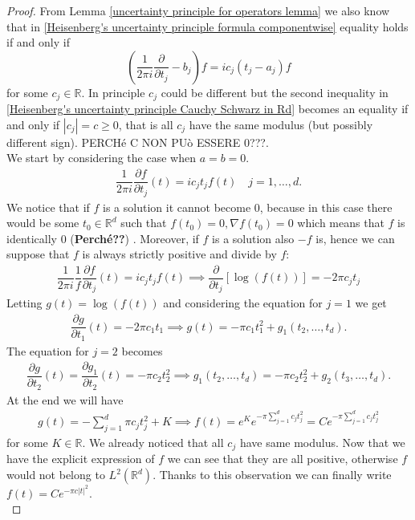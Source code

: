 \documentclass[corpo=11pt, stile=classica, tipotesi=custom,
greek, evenboxes, english]{toptesi}
\numberwithin{equation}{chapter}
\newcommand{\R}{\mathbb{R}} %
\newcommand{\pdfrac}[2]{\dfrac{\partial #1}{\partial #2}}
\begin{document}
\begin{proof}
	{\color{red} From Lemma \ref{uncertainty principle for operators lemma} we also know that in \eqref{Heisenberg's uncertainty principle formula componentwise} equality holds if and only if
	\begin{equation}\label{Heisenberg's uncertainty principle differential equation}
		\left(\dfrac{1}{2\pi i}\pdfrac{}{t_j} - b_j\right)f = ic_j (t_j-a_j)f
	\end{equation}
	for some $c_j \in \R$. In principle $c_j$ could be different but the second inequality in \eqref{Heisenberg's uncertainty principle Cauchy Schwarz in Rd} becomes an equality if and only if $|c_j|=c \geq 0$, that is all $c_j$ have the same modulus (but possibly different sign). 	PERCHé C NON PUò ESSERE 0???.\\
	We start by considering the case when $a=b=0$.
	\begin{align}\label{Heisenberg's uncertainty principle differential equation centered}
		\dfrac{1}{2\pi i}\pdfrac{f}{t_j}(t) = ic_j t_j f(t) \quad j=1,\ldots,d.
	\end{align}
	We notice that if $f$ is a solution it cannot become 0, because in this case there would be some $t_0 \in \R^d$ such that $f(t_0)=0, \nabla f(t_0)=0$ which means that $f$ is identically 0 (\textbf{Perché??}) . Moreover, if $f$ is a solution also $-f$ is, hence we can suppose that $f$ is always strictly positive and divide by $f$:
	\begin{align*}
		\dfrac{1}{2\pi i} \dfrac{1}{f} \pdfrac{f}{t_j}(t) = ic_j t_j f(t) \implies \pdfrac{}{t_j}\left[\log(f(t))\right] = -2\pi c_j t_j
	\end{align*}
	Letting $g(t)=\log(f(t))$ and considering the equation for $j=1$ we get
	\begin{align*}
		\pdfrac{g}{t_1}(t) = -2\pi c_1 t_1 \implies g(t) = - \pi c_1 t_1^2 + g_1(t_2,\ldots,t_d).
	\end{align*}
	The equation for $j=2$ becomes
	\begin{align*}
		\pdfrac{g}{t_2}(t) = \pdfrac{g_1}{t_2}(t) = -\pi c_2 t_2^2 \implies g_1(t_2,\ldots,t_d) = -\pi c_2 t_2^2 + g_2(t_3,\ldots,t_d).
	\end{align*}
	At the end we will have
	\begin{align*}
		g(t) = -\sum_{j=1}^{d}\pi c_j t_j^2 + K \implies f(t) = e^K e^{-\pi \sum_{j=1}^{d} c_j t_j^2} = C e^{-\pi \sum_{j=1}^{d} c_j t_j^2}
	\end{align*}
	for some $K \in \R$. We already noticed that all $c_j$ have same modulus. Now that we have the explicit expression of $f$ we can see that they are all positive, otherwise $f$ would not belong to $L^2(\R^d)$. Thanks to this observation we can finally write $f(t) = C e^{-\pi c |t|^2}$.\\
}
\end{proof}
\end{document}
